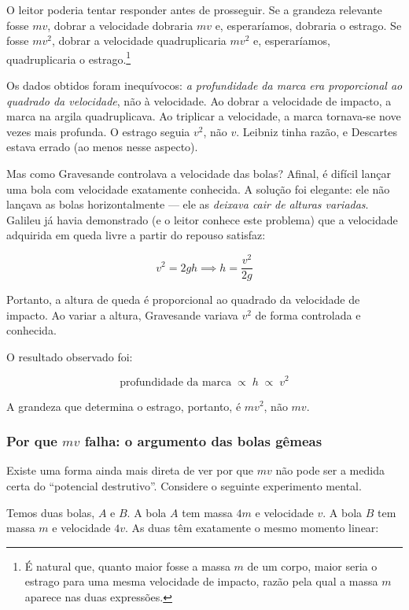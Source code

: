 O leitor poderia tentar responder antes de prosseguir. Se a grandeza relevante fosse
$mv$, dobrar a velocidade dobraria $mv$ e, esperaríamos, dobraria o estrago. Se fosse
$mv^2$, dobrar a velocidade quadruplicaria $mv^2$ e, esperaríamos, quadruplicaria
o estrago.\footnote{É natural que, quanto maior fosse a massa $m$ de um corpo, maior seria o estrago para uma mesma velocidade de impacto, razão pela qual a massa $m$ aparece nas duas expressões.}
 
Os dados obtidos foram inequívocos: \textit{a profundidade da marca era
proporcional ao quadrado da velocidade}, não à velocidade. Ao dobrar a velocidade de
impacto, a marca na argila quadruplicava. Ao triplicar a velocidade, a marca tornava-se
nove vezes mais profunda. O estrago seguia $v^2$, não $v$. Leibniz tinha razão, e Descartes estava errado (ao menos nesse aspecto).
 
Mas como Gravesande controlava a velocidade das bolas? Afinal, é difícil
lançar uma bola com velocidade exatamente conhecida. A solução foi elegante: ele não
lançava as bolas horizontalmente — ele as \textit{deixava cair de alturas variadas}.
Galileu já havia demonstrado (e o leitor conhece este problema) que a velocidade
adquirida em queda livre a partir do repouso satisfaz:
 
\[
    v^2 = 2gh \implies h = \frac{v^2}{2g}
\]
 
\noindent Portanto, a altura de queda é proporcional ao quadrado da velocidade
de impacto. Ao variar a altura, Gravesande variava $v^2$ de forma controlada
e conhecida.
 
O resultado observado foi:
 
\[
    \text{profundidade da marca} \;\propto\; h \;\propto\; v^2
\]
 
\noindent A grandeza que determina o estrago, portanto, é $mv^2$, não $mv$.
 
\subsubsection*{Por que $mv$ falha: o argumento das bolas gêmeas}
 
Existe uma forma ainda mais direta de ver por que $mv$ não pode ser a medida certa do
``potencial destrutivo''. Considere o seguinte experimento mental.
 
Temos duas bolas, $A$ e $B$. A bola $A$ tem massa $4m$ e velocidade $v$. A bola $B$ tem massa $m$
e velocidade $4v$. As duas têm exatamente o mesmo momento linear:
 
